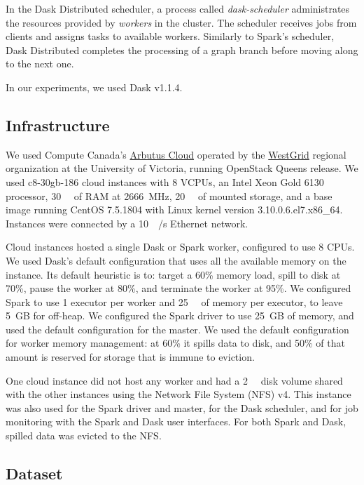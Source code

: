 \documentclass[conference]{IEEEtran}
\begin{document}
In the Dask Distributed scheduler, a process called \textit{dask-scheduler}
administrates the resources provided by \textit{workers} in the cluster. The
scheduler receives jobs from clients and assigns tasks to available workers.
Similarly to Spark's scheduler, Dask Distributed completes the processing of a
graph branch before moving along to the next one. 

In our experiments, we used Dask v1.1.4.


\subsection{Infrastructure}

 We used Compute Canada's
 \href{https://docs.computecanada.ca/wiki/Cloud\_resources}{Arbutus Cloud} operated by
 the \href{https://www.westgrid.ca}{WestGrid} regional organization at the University
 of Victoria, running OpenStack Queens release. We used c8-30gb-186 cloud
 instances with 8 VCPUs, an Intel Xeon Gold 6130 processor, \SI{30}{\giga\byte} of
 RAM at \SI{2666}{\mega\hertz}, \SI{20}{\giga\byte} of mounted storage, and a base
 image running CentOS 7.5.1804 with Linux kernel version
 3.10.0.6.el7.x86\_64. Instances were connected by a
 \SI{10}{\giga\bit/\second} Ethernet network.
 
 Cloud instances hosted a single Dask or Spark worker, configured to use 8 CPUs. We
 used Dask's default configuration that uses all the available memory on the
 instance. Its default heuristic is to: target a 60\% memory load, spill to disk at
 70\%, pause the worker at 80\%, and terminate the worker at 95\%. We configured
 Spark to use 1 executor per worker and \SI{25}{\giga\byte} of memory per executor, to leave 5~GB
 for off-heap. We configured the Spark driver to use 25~GB of memory, and used the
 default configuration for the master. We used the default configuration for worker
 memory management: at 60\% it spills data to disk, and 50\% of that amount is
 reserved for storage that is immune to eviction.
 
 One cloud instance did not host any worker and had a \SI{2}{\tera\byte} disk volume
 shared with the other instances using the Network File System (NFS) v4.
 This instance was also used for the Spark driver and master, for the
 Dask scheduler, and for job monitoring with the Spark and Dask user
 interfaces. For both Spark and Dask, spilled data was evicted to the NFS.

\subsection{Dataset}
\end{document}

